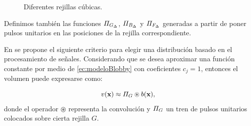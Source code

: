 \begin{figure}[htp]
\begin{center}
  \end{center}
  \caption[Rejillas cúbicas]{Diferentes rejillas cúbicas.}
  \label{fig:cubicGrids}
\end{figure}

Definimos también las funciones $\varPi_{G_\Delta}$, $\varPi_{B_\Delta}$ y $\varPi_{F_\Delta}$ generadas a partir de poner pulsos unitarios en las posiciones de la rejilla correspondiente.

En \cite{EdgarOptimization} se propone el siguiente criterio para elegir una distribución basado en el procesamiento de señales. Considerando que se desea aproximar una función constante por medio de \eqref{ec:modeloBlobby} con coeficientes $c_j = 1$, entonces el volumen puede expresarse como:

\begin{equation}
v(\textbf{x}) \approx \varPi_{G} \circledast b(\textbf{x}),
 \label{ec:convMuestreo}
\end{equation}
donde el operador $\circledast$ representa la convolución y $\varPi_{G}$ un tren de pulsos unitarios colocados sobre cierta rejilla $G$.

